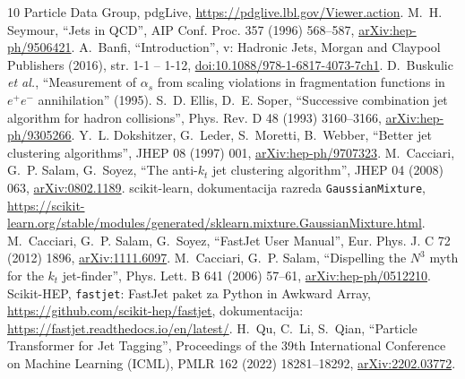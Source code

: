 \documentclass[slovene,11pt,a4paper]{article}
\begin{document}
\begin{thebibliography}{10}
Particle Data Group, pdgLive, \url{https://pdglive.lbl.gov/Viewer.action}.
M.~H. Seymour, ``Jets in QCD'', AIP Conf. Proc. 357 (1996) 568--587, \href{https://arxiv.org/abs/hep-ph/9506421}{arXiv:hep-ph/9506421}.
A.~Banfi, ``Introduction'', v: Hadronic Jets, Morgan and Claypool Publishers (2016), str. 1-1 -- 1-12, \href{https://doi.org/10.1088/978-1-6817-4073-7ch1}{doi:10.1088/978-1-6817-4073-7ch1}.
D.~Buskulic \emph{et al.}, ``Measurement of $\alpha_s$ from scaling violations in fragmentation functions in $e^+e^-$ annihilation'' (1995).
S.~D. Ellis, D.~E. Soper, ``Successive combination jet algorithm for hadron collisions'', Phys. Rev. D 48 (1993) 3160--3166, \href{https://arxiv.org/abs/hep-ph/9305266}{arXiv:hep-ph/9305266}.
Y.~L. Dokshitzer, G.~Leder, S.~Moretti, B.~Webber, ``Better jet clustering algorithms'', JHEP 08 (1997) 001, \href{https://arxiv.org/abs/hep-ph/9707323}{arXiv:hep-ph/9707323}.
M.~Cacciari, G.~P. Salam, G.~Soyez, ``The anti-$k_t$ jet clustering algorithm'', JHEP 04 (2008) 063, \href{https://arxiv.org/abs/0802.1189}{arXiv:0802.1189}.
scikit-learn, dokumentacija razreda \texttt{GaussianMixture}, \url{https://scikit-learn.org/stable/modules/generated/sklearn.mixture.GaussianMixture.html}.
M.~Cacciari, G.~P. Salam, G.~Soyez, ``FastJet User Manual'', Eur. Phys. J. C 72 (2012) 1896, \href{https://arxiv.org/abs/1111.6097}{arXiv:1111.6097}.
M.~Cacciari, G.~P. Salam, ``Dispelling the $N^{3}$ myth for the $k_t$ jet-finder'', Phys. Lett. B 641 (2006) 57--61, \href{https://arxiv.org/abs/hep-ph/0512210}{arXiv:hep-ph/0512210}.
Scikit-HEP, \texttt{fastjet}: FastJet paket za Python in Awkward Array, \url{https://github.com/scikit-hep/fastjet}, dokumentacija: \url{https://fastjet.readthedocs.io/en/latest/}.
H.~Qu, C.~Li, S.~Qian, ``Particle Transformer for Jet Tagging'', Proceedings of the 39th International Conference on Machine Learning (ICML), PMLR 162 (2022) 18281--18292, \href{https://arxiv.org/abs/2202.03772}{arXiv:2202.03772}.

\end{thebibliography}
\end{document}
